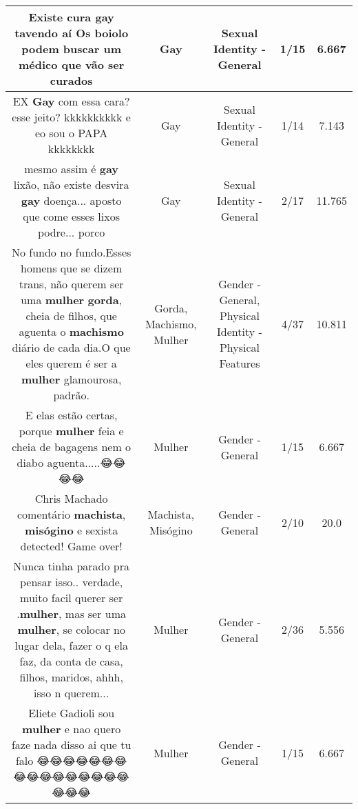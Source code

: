 \documentclass[11pt]{article}
\newlength\mylength
\begin{document}
\begin{center}
\begin{longtable}{|C{.65\mylength}|C{.30\mylength}|C{.12\mylength}|C{.12\mylength}|C{.12\mylength}|}
  \small Existe cura \textbf{gay} tavendo aí Os boiolo podem buscar um médico que vão ser curados\normalsize   & Gay & Sexual Identity - General & 1/15 & 6.667 \\  \hline
  \small EX \textbf{Gay} com essa cara? esse jeito? kkkkkkkkkk e eo sou o PAPA kkkkkkkk\normalsize   & Gay & Sexual Identity - General & 1/14 & 7.143 \\  \hline
  \small mesmo assim é \textbf{gay} lixão, não existe desvira \textbf{gay} doença... aposto que come esses lixos podre... porco\normalsize   & Gay & Sexual Identity - General & 2/17 & 11.765 \\  \hline
  \small No fundo no fundo.Esses homens que se dizem trans, não querem ser uma \textbf{mulher} \textbf{gorda}, cheia de filhos, que aguenta o \textbf{machismo} diário de cada dia.O que eles querem é ser a \textbf{mulher} glamourosa, padrão.\normalsize   & Gorda, Machismo, Mulher & Gender - General, Physical Identity - Physical Features & 4/37 & 10.811 \\  \hline
  \small E elas estão certas, porque \textbf{mulher} feia e cheia de bagagens nem o diabo aguenta.....😂😂😂😂\normalsize   & Mulher & Gender - General & 1/15 & 6.667 \\  \hline
  \small Chris Machado comentário \textbf{machista}, \textbf{misógino} e sexista detected! Game over!\normalsize   & Machista, Misógino & Gender - General & 2/10 & 20.0 \\  \hline
  \small Nunca tinha parado pra pensar isso.. verdade, muito facil querer ser .\textbf{mulher}, mas ser uma \textbf{mulher}, se colocar no lugar dela, fazer o q ela faz, da conta de casa, filhos, maridos, ahhh, isso n querem...\normalsize   & Mulher & Gender - General & 2/36 & 5.556 \\  \hline
  \small Eliete Gadioli sou \textbf{mulher} e nao quero faze nada disso ai que tu falo 😂😂😂😂😂😂😂😂😂😂😂😂😂😂😂😂😂😂😂\normalsize   & Mulher & Gender - General & 1/15 & 6.667 \\  \hline

\end{longtable}
\end{center}
\end{document}
